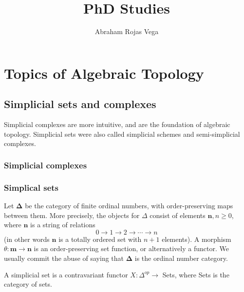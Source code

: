 \documentclass{report}
\title{PhD Studies}
\author{Abraham Rojas Vega}
\begin{document}
\maketitle

\tableofcontents

















\part*{Topics of Algebraic Topology}

\chapter{Simplicial sets and complexes}

Simplicial complexes are more intuitive, and are the foundation of algebraic topology. Simplicial sets were also called simplicial schemes and semi-simplicial complexes. 

\section{Simplicial complexes}



\section{Simplical sets}

Let $\mathbf{\Delta}$ be the category of finite ordinal numbers, with order-preserving maps between them. More precisely, the objects for $\Delta$ consist of elements $\mathbf{n}, n \geq 0$, where $\mathbf{n}$ is a string of relations
$$
0 \rightarrow 1 \rightarrow 2 \rightarrow \cdots \rightarrow n
$$
(in other words $\mathbf{n}$ is a totally ordered set with $n+1$ elements). A morphism $\theta: \mathbf{m} \rightarrow \mathbf{n}$ is an order-preserving set function, or alternatively a functor. We usually commit the abuse of saying that $\mathbf{\Delta}$ is the ordinal number category.

A simplicial set is a contravariant functor $X: \Delta^{o p} \rightarrow$ Sets, where Sets is the category of sets.
\end{document}
